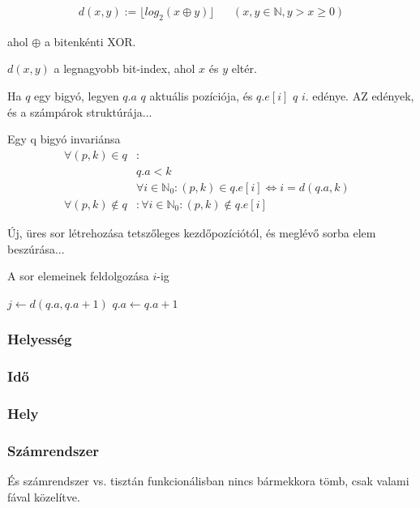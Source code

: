 \documentclass[12pt]{report}
\begin{document}
\begin{align*}
d(x, y) := \lfloor log_{2}{}(x \oplus y) \rfloor & & (x, y \in \mathbb{N}, y > x \ge 0)
\end{align*}

ahol $\oplus$ a bitenkénti XOR.

$d(x, y)$ a legnagyobb bit-index, ahol $x$ és $y$ eltér.

Ha $q$ egy bigyó, legyen $q.a$ $q$ aktuális pozíciója, és $q.e[i]$ $q$ $i$. edénye. AZ edények, és a számpárok struktúrája...

Egy q bigyó invariánsa
\begin{align*}
\forall (p, k) \in q &: &\\ 
	& q.a < k\\
	& \forall i \in \mathbb{N}_{0}: (p, k) \in q.e[i] \iff i=d(q.a, k) \\
\forall (p, k) \not\in q &: \forall i \in \mathbb{N}_{0}: (p, k) \not\in q.e[i]
\end{align*}

Új, üres sor létrehozása tetszőleges kezdőpozíciótól, és meglévő sorba elem beszúrása...

A sor elemeinek feldolgozása $i$-ig
\begin{algorithmic}[1]
	\State $j \gets d(q.a, q.a + 1)$
	\State $q.a \gets q.a + 1$
		\State {}
			\State {}
		\Else
			\State {}
		\EndIf
	\EndFor
\EndWhile
\end{algorithmic}

\subsubsection{Helyesség}

\subsubsection{Idő}

\subsubsection{Hely}

\subsubsection{Számrendszer}

És számrendszer vs. tisztán funkcionálisban nincs bármekkora tömb, csak valami fával közelítve.
\end{document}
